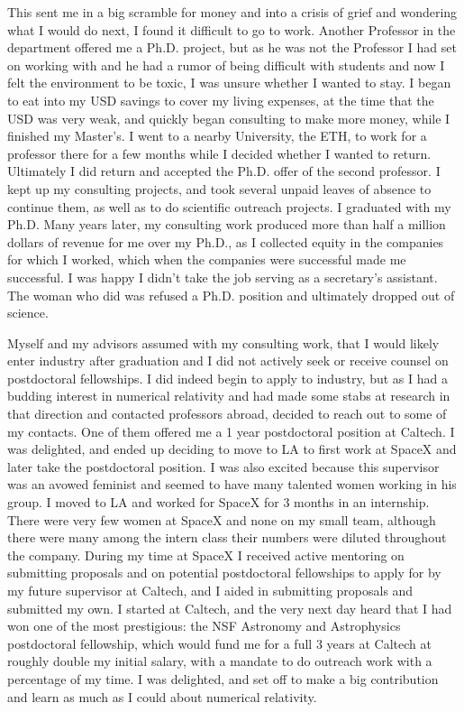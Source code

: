 \documentclass[utf8]{frontiersSCNS} %
\begin{document}
This sent me in a big scramble for money and into a crisis of grief and wondering what I would do next, I found it difficult to go to work. Another Professor in the department offered me a Ph.D. project, but as he was not the Professor I had set on working with and he had a rumor of being difficult with students and now I felt the environment to be toxic, I was unsure whether I wanted to stay. I began to eat into my USD savings to cover my living expenses, at the time that the USD was very weak, and quickly began consulting to make more money, while I finished my Master's. I went to a nearby University, the ETH, to work for a professor there for a few months while I decided whether I wanted to return. Ultimately I did return and accepted the Ph.D. offer of the second professor. I kept up my consulting projects, and took several unpaid leaves of absence to continue them, as well as to do scientific outreach projects. I graduated with my Ph.D. Many years later, my consulting work produced more than half a million dollars of revenue for me over my Ph.D., as I collected equity in the companies for which I worked, which when the companies were successful made me successful. I was happy I didn't take the job serving as a secretary's assistant. The woman who did was refused a Ph.D. position and ultimately dropped out of science.

Myself and my advisors assumed with my consulting work, that I would likely enter industry after graduation and I did not actively seek or receive counsel on postdoctoral fellowships. I did indeed begin to apply to industry, but as I had a budding interest in numerical relativity and had made some stabs at research in that direction and contacted professors abroad, decided to reach out to some of my contacts. One of them offered me a 1 year postdoctoral position at Caltech. I was delighted, and ended up deciding to move to LA to first work at SpaceX and later take the postdoctoral position. I was also excited because this supervisor was an avowed feminist and seemed to have many talented women working in his group. I moved to LA and worked for SpaceX for 3 months in an internship. There were very few women at SpaceX and none on my small team, although there were many among the intern class their numbers were diluted throughout the company. During my time at SpaceX I received active mentoring on submitting proposals and on potential postdoctoral fellowships to apply for by my future supervisor at Caltech, and I aided in submitting proposals and submitted my own. I started at Caltech, and the very next day heard that I had won one of the most prestigious: the NSF Astronomy and Astrophysics postdoctoral fellowship, which would fund me for a full 3 years at Caltech at roughly double my initial salary, with a mandate to do outreach work with a percentage of my time. I was delighted, and set off to make a big contribution and learn as much as I could about numerical relativity.
\end{document}
